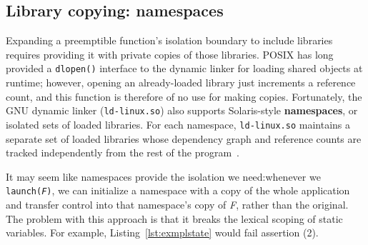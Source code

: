 \subsection{Library copying: namespaces}
\label{sec:namespaces}

Expanding a preemptible function's isolation boundary to include libraries requires
providing it with private copies of those libraries.  POSIX has long provided a
\texttt{dlopen()} interface to the dynamic linker for loading shared objects at
runtime; however, opening an already-loaded library just increments
a reference count, and this function is therefore of no use for making copies.
Fortunately, the GNU dynamic linker (\texttt{ld-linux.so}) also supports
Solaris-style \textbf{namespaces}, or isolated sets of loaded libraries.  For each
namespace, \texttt{ld-linux.so} maintains a separate set of loaded libraries whose
dependency graph and reference counts are tracked independently from the rest of the
program~\cite{dlmopen-manpage}.

It may seem like namespaces provide the isolation we need:\@ whenever we
\texttt{launch(\textnormal{\textit{F}})}, we can initialize a namespace with a copy
of the whole application and transfer control into that namespace's copy of
\textit{F}, rather than the original.  The problem with this approach is that it
breaks the lexical scoping of static variables.  For example,
Listing~\ref{lst:exmplstate} would fail assertion (2).

